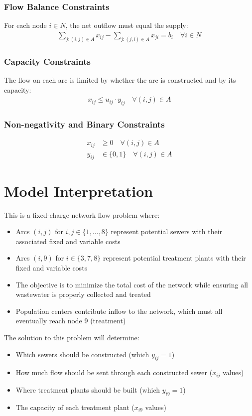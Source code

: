 \documentclass{article}
\begin{document}
\subsubsection{Flow Balance Constraints}
For each node $i \in N$, the net outflow must equal the supply:
\begin{align}
    \sum_{j:(i,j) \in A} x_{ij} - \sum_{j:(j,i) \in A} x_{ji} = b_i \quad \forall i \in N
\end{align}

\subsubsection{Capacity Constraints}
The flow on each arc is limited by whether the arc is constructed and by its capacity:
\begin{align}
    x_{ij} \leq u_{ij} \cdot y_{ij} \quad \forall (i,j) \in A
\end{align}

\subsubsection{Non-negativity and Binary Constraints}
\begin{align}
    x_{ij} &\geq 0 \quad \forall (i,j) \in A \\
    y_{ij} &\in \{0,1\} \quad \forall (i,j) \in A
\end{align}

\section{Model Interpretation}
This is a fixed-charge network flow problem where:
\begin{itemize}
    \item Arcs $(i,j)$ for $i,j \in \{1,\ldots,8\}$ represent potential sewers with their associated fixed and variable costs
    \item Arcs $(i,9)$ for $i \in \{3,7,8\}$ represent potential treatment plants with their fixed and variable costs
    \item The objective is to minimize the total cost of the network while ensuring all wastewater is properly collected and treated
    \item Population centers contribute inflow to the network, which must all eventually reach node 9 (treatment)
\end{itemize}

The solution to this problem will determine:
\begin{itemize}
    \item Which sewers should be constructed (which $y_{ij} = 1$)
    \item How much flow should be sent through each constructed sewer ($x_{ij}$ values)
    \item Where treatment plants should be built (which $y_{i9} = 1$)
    \item The capacity of each treatment plant ($x_{i9}$ values)
\end{itemize}
\end{document}
